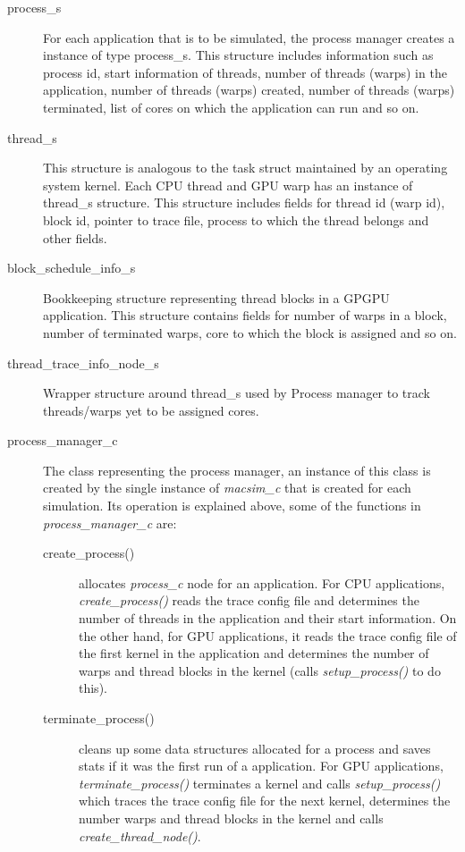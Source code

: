 \begin{description}


\item [process\_s] For each application that is to be simulated, the process manager
creates a instance of type process\_s. This structure includes information such
as process id, start information of threads, number of threads (warps) in
the application, number of threads (warps) created, number of threads (warps)
  terminated, list of cores on which the application can run and so on.

\item [thread\_s] This structure is analogous to the task struct maintained by
an operating system kernel. Each CPU thread and GPU warp has an instance of
thread\_s structure. This structure includes fields for thread id (warp id),
  block id, pointer to trace file, process to which the thread belongs and
  other fields. 

\item [block\_schedule\_info\_s] Bookkeeping structure representing thread blocks in
a GPGPU application. This structure contains fields for number of warps in a
block, number of terminated warps, core to which the block is assigned and so
on.

\item [thread\_trace\_info\_node\_s] Wrapper structure around thread\_s used by
Process manager to track threads/warps yet to be assigned cores.


\item [process\_manager\_c] The class representing the process manager, an
instance of this class is created by the single instance of \textit{macsim\_c}
that is created for each simulation. Its operation is explained above, some of
the functions in \textit{process\_manager\_c} are:
\begin{description}

\item [create\_process()] allocates \textit{process\_c} node for an
application. For CPU applications, \textit{create\_process()} reads the trace
config file and determines the number of threads in the application and their
start information. On the other hand, for GPU applications, it reads the trace
config file of the first kernel in the application and determines the number of
warps and thread blocks in the kernel (calls \textit{setup\_process()} to do this).

\item [terminate\_process()] cleans up some data structures allocated for a
process and saves stats if it was the first run of a application. For GPU
applications, \textit{terminate\_process()}  terminates a kernel and calls
\textit{setup\_process()} which traces the trace config file for the next
kernel, determines the number warps and thread blocks in the kernel and calls
\textit{create\_thread\_node()}.


\end{description}
\end{description}

